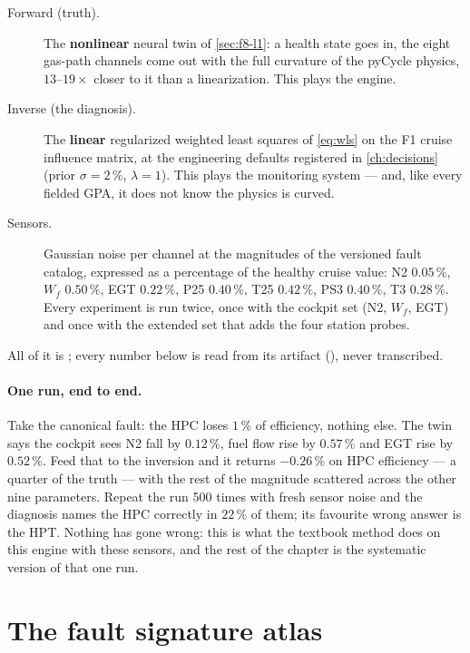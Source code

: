 \begin{description}
  \item[Forward (truth).] The \textbf{nonlinear} neural twin of \cref{sec:f8-l1}: a health
    state goes in, the eight gas-path channels come out with the full curvature of the pyCycle
    physics, $13$--$19\times$ closer to it than a linearization. This plays the engine.
  \item[Inverse (the diagnosis).] The \textbf{linear} regularized weighted least squares of
    \cref{eq:wls} on the F1 cruise influence matrix, at the engineering defaults registered in
    \cref{ch:decisions} (prior $\sigma = 2\,\%$, $\lambda = 1$). This plays the monitoring
    system --- and, like every fielded GPA, it does not know the physics is curved.
  \item[Sensors.] Gaussian noise per channel at the magnitudes of the versioned fault catalog,
    expressed as a percentage of the healthy cruise value: N2 $0.05\,\%$, $W_f$ $0.50\,\%$,
    EGT $0.22\,\%$, P25 $0.40\,\%$, T25 $0.42\,\%$, PS3 $0.40\,\%$, T3 $0.28\,\%$. Every
    experiment is run twice, once with the cockpit set (N2, $W_f$, EGT) and once with the
    extended set that adds the four station probes.
\end{description}

All of it is ; every number below is read from its artifact
(), never transcribed.

\paragraph{One run, end to end.} Take the canonical fault: the HPC loses $1\,\%$ of
efficiency, nothing else. The twin says the cockpit sees N2 fall by $0.12\,\%$, fuel flow rise
by $0.57\,\%$ and EGT rise by $0.52\,\%$. Feed that to the inversion and it returns
$-0.26\,\%$ on HPC efficiency --- a quarter of the truth --- with the rest of the magnitude
scattered across the other nine parameters. Repeat the run 500 times with fresh sensor noise
and the diagnosis names the HPC correctly in $22\,\%$ of them; its favourite wrong answer is
the HPT. Nothing has gone wrong: this is what the textbook method does on this engine with
these sensors, and the rest of the chapter is the systematic version of that one run.

\section{The fault signature atlas}
\label{sec:gpa-atlas}

